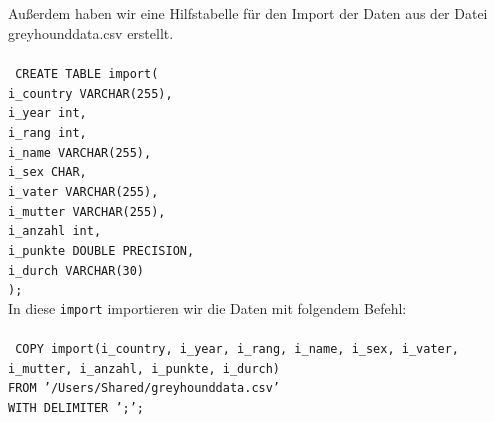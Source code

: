 \documentclass[10pt,a4paper]{article}
\begin{document}
	\\ \\
	Außerdem haben wir eine Hilfstabelle für den Import der Daten aus der Datei greyhounddata.csv erstellt.
	\\ \\
	\texttt{
		CREATE TABLE import(\\
		\hspace*{4mm}	i\_country VARCHAR(255),\\
		\hspace*{4mm}	i\_year int,\\
		\hspace*{4mm}	i\_rang int,\\
		\hspace*{4mm}	i\_name VARCHAR(255),\\
		\hspace*{4mm}	i\_sex CHAR,\\
		\hspace*{4mm}	i\_vater VARCHAR(255),\\
		\hspace*{4mm}	i\_mutter VARCHAR(255),\\
		\hspace*{4mm}	i\_anzahl int,\\
		\hspace*{4mm}	i\_punkte DOUBLE PRECISION,\\
		\hspace*{4mm}	i\_durch VARCHAR(30)\\
		);\\
		}
	\newpage
	\noindent In diese \texttt{import} importieren wir die Daten mit folgendem Befehl:\\ \\
	\texttt{
		COPY import(i\_country, i\_year, i\_rang, i\_name, i\_sex, i\_vater, i\_mutter, i\_anzahl, i\_punkte, i\_durch)\\
		FROM '/Users/Shared/greyhounddata.csv'\\
		WITH DELIMITER ';';\\
		}
\end{document}
